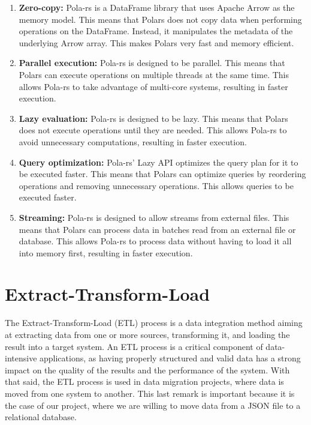 \begin{enumerate}
    \itemsep0.5em
    \item \textbf{Zero-copy:} Pola-rs is a DataFrame library that uses Apache Arrow as the memory model. This means that Polars does not copy data when performing operations on the DataFrame. Instead, it manipulates the metadata of the underlying Arrow array. This makes Polars very fast and memory efficient.
    \item \textbf{Parallel execution:} Pola-rs is designed to be parallel. This means that Polars can execute operations on multiple threads at the same time. This allows Pola-rs to take advantage of multi-core systems, resulting in faster execution.
    \item \textbf{Lazy evaluation:} Pola-rs is designed to be lazy. This means that Polars does not execute operations until they are needed. This allows Pola-rs to avoid unnecessary computations, resulting in faster execution.
    \item \textbf{Query optimization:} Pola-rs' Lazy API optimizes the query plan for it to be executed faster. This means that Polars can optimize queries by reordering operations and removing unnecessary operations. This allows queries to be executed faster.
    \item \textbf{Streaming:} Pola-rs is designed to allow streams from external files. This means that Polars can process data in batches read from an external file or database. This allows Pola-rs to process data without having to load it all into memory first, resulting in faster execution.
\end{enumerate}

\section{Extract-Transform-Load}

The Extract-Transform-Load (ETL) process is a data integration method aiming at extracting data from one or more sources, transforming it, and loading the result into a target system. An ETL process is a critical component of data-intensive applications, as having properly structured and valid data has a strong impact on the quality of the results and the performance of the system. With that said, the ETL process is used in data migration projects, where data is moved from one system to another. This last remark is important because it is the case of our project, where we are willing to move data from a JSON file to a relational database.

